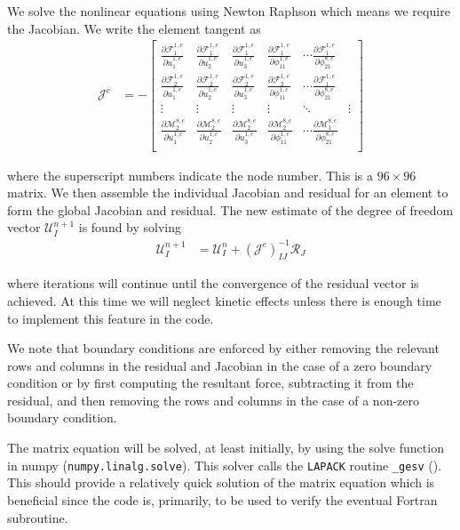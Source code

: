 We solve the nonlinear equations using Newton Raphson which means we require the Jacobian. We write the element tangent as
\begin{align*}
\mathcal{J}^e &= -\left[\begin{array}{cccccc}
\frac{\partial \mathcal{F}_{1}^{1,e}}{\partial u_1^{1,e}} & \frac{\partial \mathcal{F}_{1}^{1,e}}{\partial u_2^{1,e}} & \frac{\partial \mathcal{F}_{1}^{1,e}}{\partial u_3^{1,e}} & \frac{\partial \mathcal{F}_{1}^{1,e}}{\partial \phi_{11}^{1,e}} & \cdots \frac{\partial \mathcal{F}_{1}^{1,e}}{\partial \phi_{21}^{8,e}}\\
\frac{\partial \mathcal{F}_{2}^{1,e}}{\partial u_1^{1,e}} & \frac{\partial \mathcal{F}_{2}^{1,e}}{\partial u_2^{1,e}} & \frac{\partial \mathcal{F}_{2}^{1,e}}{\partial u_3^{1,e}} & \frac{\partial \mathcal{F}_{2}^{1,e}}{\partial \phi_{11}^{1,e}} & \cdots \frac{\partial \mathcal{F}_{1}^{1,e}}{\partial \phi_{21}^{8,e}}\\
\vdots & \vdots & \vdots & \vdots & \ddots & \vdots\\
\frac{\partial \mathcal{M}_{2}^{8,e}}{\partial u_1^{1,e}} & \frac{\partial \mathcal{M}_{2}^{8,e}}{\partial u_2^{1,e}} & \frac{\partial \mathcal{M}_{2}^{8,e}}{\partial u_3^{1,e}} & \frac{\partial \mathcal{M}_{2}^{8,e}}{\partial \phi_{11}^{1,e}} & \cdots \frac{\partial \mathcal{M}_{1}^{8,e}}{\partial \phi_{21}^{8,e}}\\
\end{array}\right]
\end{align*}

where the superscript numbers indicate the node number. This is a $96 \times 96$ matrix. We then assemble the individual Jacobian and residual for an element to form the global Jacobian and residual. The new estimate of the degree of freedom vector $\mathcal{U}_I^{n+1}$ is found by solving
\begin{align*}
\mathcal{U}_I^{n+1} &= \mathcal{U}_I^{n} + \left(\mathcal{J}^{e}\right)_{IJ}^{-1}\mathcal{R}_J
\end{align*}

where iterations will continue until the convergence of the residual vector is achieved. At this time we will neglect kinetic effects unless there is enough time to implement this feature in the code.

We note that boundary conditions are enforced by either removing the relevant rows and columns in the residual and Jacobian in the case of a zero boundary condition or by first computing the resultant force, subtracting it from the residual, and then removing the rows and columns in the case of a non-zero boundary condition.

The matrix equation will be solved, at least initially, by using the solve function in numpy (\verb|numpy.linalg.solve|). This solver calls the \verb|LAPACK| routine \verb|_gesv| (\cite{bib:numpy.linalg.solve}). This should provide a relatively quick solution of the matrix equation which is beneficial since the code is, primarily, to be used to verify the eventual Fortran subroutine.

\FloatBarrier
